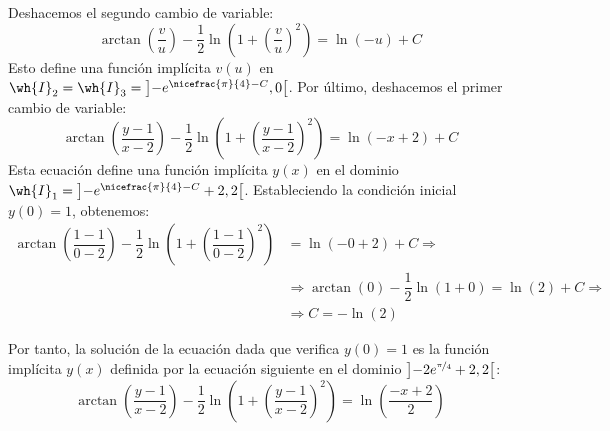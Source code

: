 \begin{ejercicio}
    Deshacemos el segundo cambio de variable:
    \begin{equation*}
        \arctan\left(\dfrac{v}{u}\right) - \dfrac{1}{2}\ln\left(1+\left(\dfrac{v}{u}\right)^2\right) = \ln(-u)+C
    \end{equation*}
    Esto define una función implícita $v(u)$ en $\wh{I}_2=\wh{I}_3=\left]-e^{\nicefrac{\pi}{4}-C},0\right[$.
    Por último, deshacemos el primer cambio de variable:
    \begin{equation*}
        \arctan\left(\dfrac{y-1}{x-2}\right) - \dfrac{1}{2}\ln\left(1+\left(\dfrac{y-1}{x-2}\right)^2\right) = \ln(-x+2)+C
    \end{equation*}
    Esta ecuación define una función implícita $y(x)$ en el dominio $\wh{I}_1 = \left]-e^{\nicefrac{\pi}{4}-C}+2, 2\right[$. Estableciendo la condición inicial $y(0)=1$, obtenemos:
    \begin{align*}
        \arctan\left(\dfrac{1-1}{0-2}\right) - \dfrac{1}{2}\ln\left(1+\left(\dfrac{1-1}{0-2}\right)^2\right) &= \ln(-0+2)+C \Longrightarrow \\ &\Longrightarrow \arctan\left(0\right) - \dfrac{1}{2}\ln\left(1+0\right) = \ln(2)+C \Longrightarrow \\ &\Longrightarrow C=-\ln(2)
    \end{align*}

    Por tanto, la solución de la ecuación dada que verifica $y(0)=1$ es la función implícita $y(x)$ definida por la ecuación siguiente en el dominio $\left]-2e^{\nicefrac{\pi}{4}}+2,2\right[$:
    \begin{equation*}
        \arctan\left(\dfrac{y-1}{x-2}\right) - \dfrac{1}{2}\ln\left(1+\left(\dfrac{y-1}{x-2}\right)^2\right) = \ln\left(\dfrac{-x+2}{2}\right)
    \end{equation*}
\end{ejercicio}

